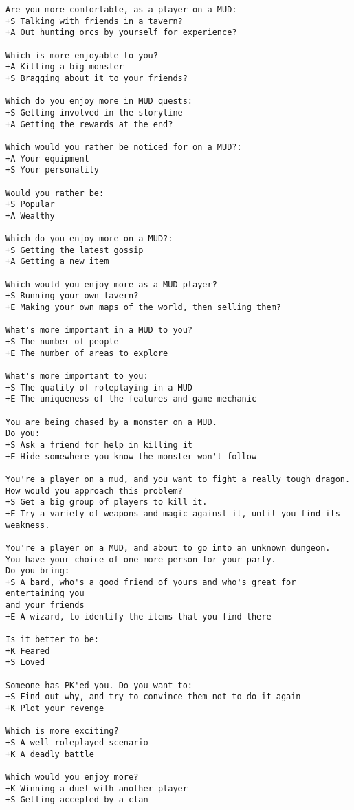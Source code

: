 \begin{verbatim}
Are you more comfortable, as a player on a MUD:
+S Talking with friends in a tavern?
+A Out hunting orcs by yourself for experience?

Which is more enjoyable to you?
+A Killing a big monster
+S Bragging about it to your friends?

Which do you enjoy more in MUD quests:
+S Getting involved in the storyline
+A Getting the rewards at the end?

Which would you rather be noticed for on a MUD?:
+A Your equipment
+S Your personality

Would you rather be:
+S Popular
+A Wealthy

Which do you enjoy more on a MUD?:
+S Getting the latest gossip
+A Getting a new item

Which would you enjoy more as a MUD player?
+S Running your own tavern?
+E Making your own maps of the world, then selling them?

What's more important in a MUD to you?
+S The number of people
+E The number of areas to explore

What's more important to you:
+S The quality of roleplaying in a MUD
+E The uniqueness of the features and game mechanic

You are being chased by a monster on a MUD.
Do you:
+S Ask a friend for help in killing it
+E Hide somewhere you know the monster won't follow

You're a player on a mud, and you want to fight a really tough dragon.
How would you approach this problem?
+S Get a big group of players to kill it.
+E Try a variety of weapons and magic against it, until you find its weakness.

You're a player on a MUD, and about to go into an unknown dungeon.
You have your choice of one more person for your party.
Do you bring:
+S A bard, who's a good friend of yours and who's great for entertaining you 
and your friends
+E A wizard, to identify the items that you find there

Is it better to be:
+K Feared
+S Loved

Someone has PK'ed you. Do you want to:
+S Find out why, and try to convince them not to do it again
+K Plot your revenge

Which is more exciting?
+S A well-roleplayed scenario
+K A deadly battle

Which would you enjoy more?
+K Winning a duel with another player
+S Getting accepted by a clan


\end{verbatim}
